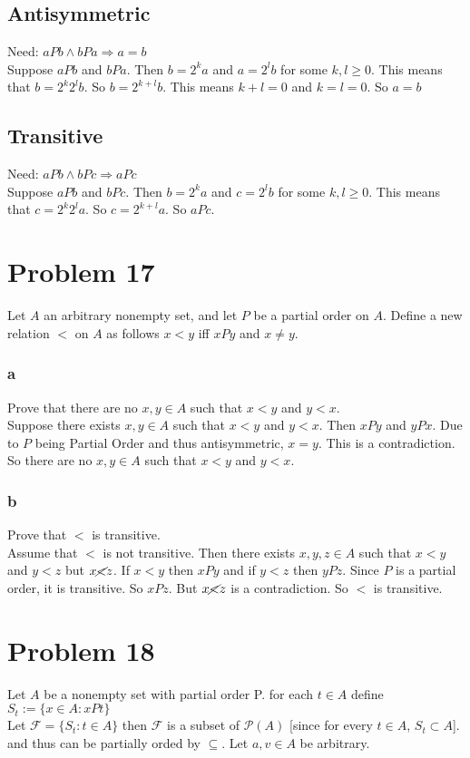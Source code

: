 \documentclass{article}
\begin{document}
\subsection*{Antisymmetric}
Need: $aPb \land bPa \Rightarrow a = b$\\
Suppose $aPb$ and $bPa$. Then $b = 2^ka$ and $a = 2^lb$ for some $k, l \geq 0$. This means that $b = 2^k2^lb$. So $b = 2^{k+l}b$. This means $k+l = 0$ and $k = l = 0$. So $a = b$
\subsection*{Transitive}
Need: $aPb \land bPc \Rightarrow aPc$\\
Suppose $aPb$ and $bPc$. Then $b = 2^ka$ and $c = 2^lb$ for some $k, l \geq 0$. This means that $c = 2^k2^la$. So $c = 2^{k+l}a$. So $aPc$.\\
\section*{Problem 17}
Let $A$ an arbitrary nonempty set, and let $P$ be a partial order on $A$. Define a new relation $<$ on $A$ as follows $x<y$ iff $xPy$ and $x \neq y$. 
\subsubsection*{a}
Prove that there are no $x,y \in A$ such that $x<y$ and $y<x$.\\
Suppose there exists $x, y \in A$ such that $x<y$ and $y<x$. Then $xPy$ and $yPx$. Due to $P$ being Partial Order and thus antisymmetric, $x = y$. This is a contradiction. So there are no $x, y \in A$ such that $x<y$ and $y<x$.\\
\subsubsection*{b}
Prove that $<$ is transitive.\\
Assume that $<$ is not transitive. Then there exists $x,y,z\in A$ such that $x<y$ and $y<z$ but $x \cancel{<} z$. If $x<y$ then $xPy$ and if $y<z$ then $yPz$. Since $P$ is a partial order, it is transitive. So $xPz$. But $x \cancel{<} z$ is a contradiction. So $<$ is transitive.\\

\section*{Problem 18}
Let $A$ be a nonempty set with partial order P. for each $t \in A$ define $S_t := \{ x \in A: xPt\}$\\
Let $\mathscr{F} = \{S_t : t \in A \}$ then $\mathscr{F}$ is a subset of $\mathscr{P}(A)$ [since for every $t \in A$, $S_t \subset A$]. and thus can be partially orded by $\subseteq $. Let $a,v \in A$ be arbitrary.
\end{document}
